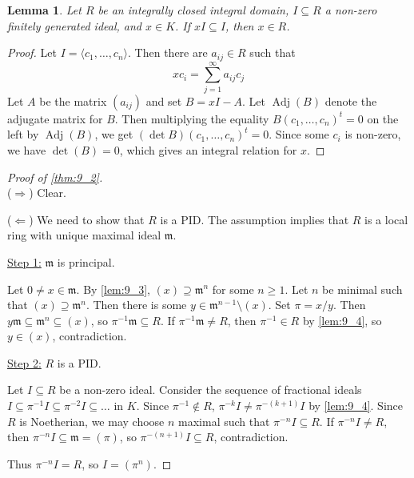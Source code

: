 \documentclass[11pt]{article}
\theoremstyle{definition}
\theoremstyle{plain}
\newtheorem{lemma}[definition]{Lemma}
\theoremstyle{remark}
\DeclareMathOperator{\Adj}{Adj}
\newcommand{\fm}{\mathfrak{m}}
\begin{document}
\begin{lemma}\label{lem:9_4}
    Let $R$ be an integrally closed integral domain, $I \subseteq R$ a non-zero finitely generated ideal, and $x \in K$. If $x I \subseteq I$, then $x \in R$.
\end{lemma}
\begin{proof}
    Let $I = \langle c_1, \ldots, c_n \rangle$. Then there are $a_{ij} \in R$ such that
    \begin{equation*}
        x c_i = \sum_{j=1}^\infty a_{ij} c_j
    \end{equation*}
    Let $A$ be the matrix $(a_{ij})$ and set $B = x I - A$. Let $\Adj(B)$ denote the adjugate matrix for $B$. Then multiplying the equality $B (c_1, \ldots, c_n)^t = 0$ on the left by $\Adj(B)$, we get $(\det{B}) (c_1, \ldots, c_n)^t = 0$. Since some $c_i$ is non-zero, we have $\det(B) = 0$, which gives an integral relation for $x$.
\end{proof}

\begin{proof}[Proof of \autoref{thm:9_2}]\phantom{}\\
    \noindent ($\Rightarrow$) Clear.

    \noindent ($\Leftarrow$) We need to show that $R$ is a PID. The assumption implies that $R$ is a local ring with unique maximal ideal $\fm$.

    \noindent \underline{Step 1:} $\fm$ is principal.

    Let $0 \neq x \in \fm$. By \autoref{lem:9_3}, $(x) \supseteq \fm^n$ for some $n \ge 1$. Let $n$ be minimal such that $(x) \supseteq \fm^n$. Then there is some $y \in \fm^{n-1} \setminus (x)$. Set $\pi = x / y$. Then $y \fm \subseteq \fm^n \subseteq (x)$, so $\pi^{-1} \fm \subseteq R$. If $\pi^{-1} \fm \neq R$, then $\pi^{-1} \in R$ by \autoref{lem:9_4}, so $y \in (x)$, contradiction.

    \noindent \underline{Step 2:} $R$ is a PID.

    Let $I \subseteq R$ be a non-zero ideal. Consider the sequence of fractional ideals $I \subseteq \pi^{-1} I \subseteq \pi^{-2} I \subseteq \ldots$ in $K$. Since $\pi^{-1} \notin R$, $\pi^{-k} I \neq \pi^{-(k+1)} I$ by \autoref{lem:9_4}. Since $R$ is Noetherian, we may choose $n$ maximal such that $\pi^{-n} I \subseteq R$. If $\pi^{-n} I \neq R$, then $\pi^{-n} I \subseteq \fm = (\pi)$, so $\pi^{-(n+1)} I \subseteq R$, contradiction.

    Thus $\pi^{-n} I = R$, so $I = (\pi^n)$.
\end{proof}
\end{document}
